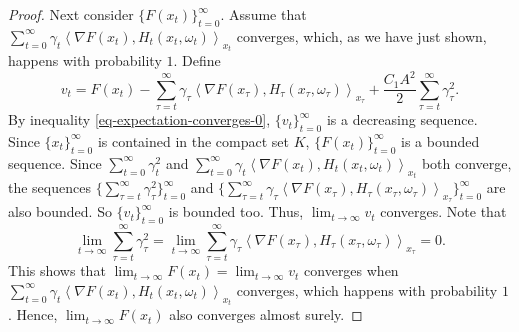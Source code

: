 \documentclass[10pt,a4paper]{amsart}
\newcommand{\g}{\gamma}
\begin{document}
\begin{proof}
Next consider $\{F(x_t)\}_{t=0}^\infty$. Assume that $\sum_{t=0}^\infty \g_t \left\langle \nabla F(x_t), H_t(x_t,\omega_t)\right\rangle_{x_t}$ converges, which, as we have just shown, happens with probability $1$. Define 
\[
v_t = F(x_t) -\sum_{\tau=t}^\infty \g_\tau \left\langle \nabla F(x_\tau), H_\tau (x_\tau,\omega_\tau)\right\rangle_{x_\tau} + \frac{C_1 A^2}{2} \sum_{\tau=t}^\infty \g_\tau^2.
\]
By inequality \eqref{eq-expectation-converges-0}, $\{v_t\}_{t=0}^\infty$ is a decreasing sequence. Since $\{x_t\}_{t=0}^\infty$ is contained in the compact set $K$, $\{F(x_t)\}_{t=0}^\infty$ is a bounded sequence. Since $\sum_{t=0}^\infty \g_t^2$ and $\sum_{t=0}^\infty \g_t\left\langle \nabla F(x_t), H_t(x_t,\omega_t)\right\rangle_{x_t}$ both converge, the sequences $\{\sum_{\tau=t}^\infty \g_\tau^2\}_{t=0}^\infty$ and $\{\sum_{\tau=t}^\infty \g_\tau \left\langle \nabla F(x_\tau), H_\tau (x_\tau,\omega_\tau)\right\rangle_{x_\tau}\}_{t=0}^\infty$ are also bounded. So $\{v_t\}_{t=0}^\infty$ is bounded too. Thus, $\lim_{t \rightarrow \infty} v_t$ converges. Note that 
\[
\lim_{t \rightarrow \infty} \sum_{\tau=t}^\infty \g_\tau^2 = \lim_{t \rightarrow \infty} \sum_{\tau=t}^\infty \g_\tau \left\langle \nabla F(x_\tau), H_\tau(x_\tau,\omega_\tau)\right\rangle_{x_\tau} =0.
\]
This shows that $\lim_{t\rightarrow \infty} F(x_t) = \lim_{t \rightarrow \infty} v_t$ converges when $\sum_{t=0}^\infty \g_t \left\langle \nabla F(x_t), H_t(x_t,\omega_t)\right\rangle_{x_t}$ converges, which happens with probability $1$. Hence, $\lim_{t\rightarrow \infty} F(x_t)$ also converges almost surely.
\end{proof}
\end{document}
